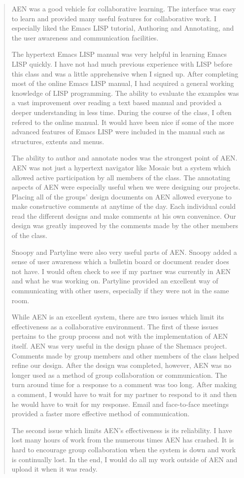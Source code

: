 \begin{quote}
     AEN was a good vehicle for collaborative learning.  The interface was easy to learn
and provided many useful features for collaborative work.  I especially liked the Emacs
LISP tutorial, Authoring and Annotating, and the user awareness and communication
facilities.

     The hypertext Emacs LISP manual was very helpful in learning Emacs LISP quickly.  I
have not had much previous experience with LISP before this class and was a little
apprehensive when I signed up.  After completing most of the online Emacs LISP manual, I
had acquired a general working knowledge of LISP programming.  The ability to evaluate
the examples was a vast improvement over reading a text based manual and provided a
deeper understanding in less time.  During the course of the class, I often refered to
the online manual.  It would have been nice if some of the more advanced features of
Emacs LISP were included in the manual such as structures, extents and menus.

     The ability to author and annotate nodes was the strongest point of AEN.  AEN was
not just a hypertext navigator like Mosaic but a system which allowed active
participation by all members of the class.  The annotating aspects of AEN were
especially useful when we were designing our projects.  Placing all of the groups'
design documents on AEN allowed everyone to make constructive comments at anytime of the
day.  Each individual could read the different designs and make comments at his own
convenince.  Our design was greatly improved by the comments made by the other members
of the class.

     Snoopy and Partyline were also very useful parts of AEN.  Snoopy added a sense of
user awareness which a bulletin board or document reader does not have.  I would often
check to see if my partner was currently in AEN and what he was working on.  Partyline
provided an excellent way of communicating with other users, especially if they were not
in the same room.

     While AEN is an excellent system, there are two issues which limit its
effectiveness as a collaborative environment.  The first of these issues pertains to the
group process and not with the implementation of AEN itself.  AEN was very useful in the
design phase of the Shemacs project.  Comments made by group members and other members
of the class helped refine our design.  After the design was completed, however, AEN was
no longer used as a method of group collaboration or communication.  The turn around
time for a response to a comment was too long.  After making a comment, I would have to
wait for my partner to respond to it and then he would have to wait for my response.
Email and face-to-face meetings provided a faster more effective method of
communication.

     The second issue which limits AEN's effectiveness is its reliability.  I have lost
many hours of work from the numerous times AEN has crashed.  It is hard to encourage
group collaboration when the system is down and work is continually lost.  In the end, I
would do all my work outside of AEN and upload it when it was ready. 
\end{quote}

